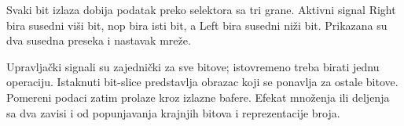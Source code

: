 Svaki bit izlaza dobija podatak preko selektora sa tri grane. Aktivni signal Right bira susedni viši bit, nop bira isti bit, a Left bira susedni niži bit. Prikazana su dva susedna preseka i nastavak mreže.

Upravljački signali su zajednički za sve bitove; istovremeno treba birati jednu operaciju. Istaknuti bit-slice predstavlja obrazac koji se ponavlja za ostale bitove. Pomereni podaci zatim prolaze kroz izlazne bafere. Efekat množenja ili deljenja sa dva zavisi i od popunjavanja krajnjih bitova i reprezentacije broja.
